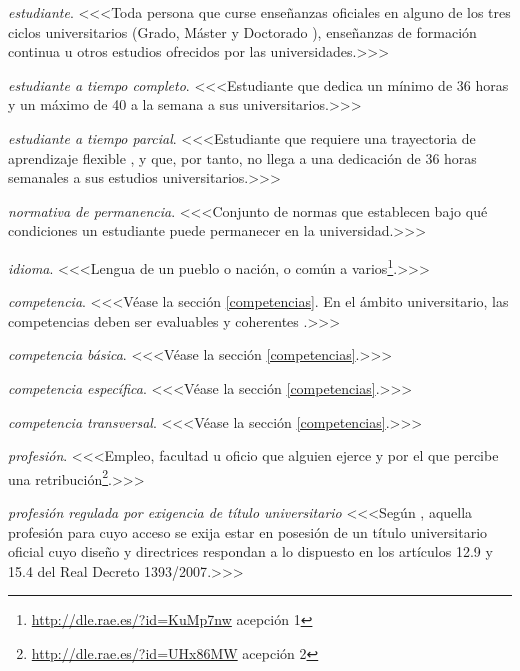     \item \emph{estudiante}. <<<Toda  persona  que  curse  enseñanzas  oficiales en alguno de los tres ciclos universitarios (Grado, Máster y Doctorado \cite[artículo 8]{rd1393}), enseñanzas de formación continua u otros estudios ofrecidos por las universidades\cite[artículo 1, apartado 3]{estatutoEstudiante}.>>>

    \item \emph{estudiante a tiempo completo}. <<<Estudiante que dedica un mínimo de 36 horas y un máximo de 40 a la semana a sus universitarios\cite[artículo 4, apartado 4]{rdECTS}.>>>

    \item \emph{estudiante a tiempo parcial}. <<<Estudiante que requiere una trayectoria de aprendizaje flexible \cite[artículo 7, apartado 2]{estatutoEstudiante}, y que, por tanto, no llega a una dedicación de 36 horas semanales a sus estudios universitarios.>>>

    \item \emph{normativa de permanencia}. <<<Conjunto de normas que establecen bajo qué condiciones un estudiante puede permanecer en la universidad.>>>

    \item \emph{idioma}. <<<Lengua de un pueblo o nación, o común a varios\footnote{\url{http://dle.rae.es/?id=KuMp7nw} acepción 1}.>>>

    \item \emph{competencia}. <<<Véase la sección \ref{competencias}.  En el ámbito universitario, las competencias deben ser evaluables y coherentes \cite[página 19]{guiaAneca}.>>>

    \item \emph{competencia básica}. <<<Véase la sección \ref{competencias}.>>>

    \item \emph{competencia específica}. <<<Véase la sección \ref{competencias}.>>>

    \item \emph{competencia transversal}. <<<Véase la sección \ref{competencias}.>>>

    \item \emph{profesión}. <<<Empleo, facultad u oficio que alguien ejerce y por el que percibe una retribución\footnote{\url{http://dle.rae.es/?id=UHx86MW} acepción 2}.>>>

    \item \emph{profesión regulada por exigencia de título universitario} <<<Según \cite[artículo 4, apartado c]{rdECTS}, aquella profesión para cuyo acceso se exija estar en posesión de un título universitario oficial cuyo diseño y directrices respondan a lo dispuesto en los artículos 12.9 y 15.4 del Real Decreto 1393/2007\cite{rd1393}.>>>

